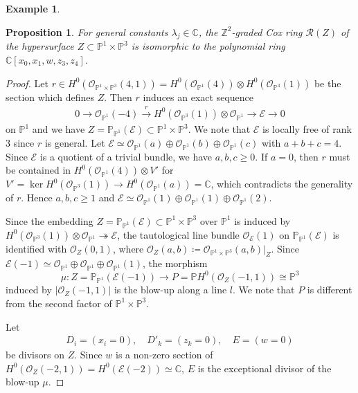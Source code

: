 \documentclass[a4paper,11pt]{amsart}
\theoremstyle{plain}
\newtheorem{proposition}[theorem]{Proposition}
\theoremstyle{definition}
\newtheorem{example}[theorem]{Example}
\newcommand{\C}{\mathbb{C}}
\newcommand{\p}{\mathbb{P}}
\newcommand{\R}{\mathcal{R}}
\newcommand{\Z}{\mathbb{Z}}
\newcommand{\Ox}{\mathcal{O}}
\newcommand{\balazs}[1]{{\color{blue} [#1]}}
\begin{document}
\begin{example}
\begin{proposition}\label{prop:linear}
         For general constants $\lambda_j\in\C$, the $\Z^2$-graded Cox ring $\R(Z)$ of the hypersurface $Z \subset \p^1 \times \p^3$ is isomorphic to the polynomial ring $\C[x_0,x_1,w,z_3,z_4]$.    
\end{proposition}

\begin{proof}
Let $r \in H^0(\Ox_{\p^1 \times \p^3}(4,1)) =H^0(\Ox_{\p^1}(4)) \otimes H^0( \Ox_{\p^3}(1)) $ be the section which defines $Z$.
Then $r$ induces an exact sequence
\begin{align*}
0 \to \Ox_{\p^1}(-4) \xrightarrow{r} H^0( \Ox_{\p^3}(1)) \otimes \Ox_{\p^1} \to \mathcal{E} \to 0
\end{align*}
on $\p^1$
and we have $Z =\p_{\p^1}(\mathcal{E})\subset \p^1 \times \p^3$.
We note that $\mathcal{E}$ is locally free of rank $3$
since $r$ is general.
Let $\mathcal{E} \simeq \Ox_{\p^1} (a) \oplus \Ox_{\p^1} (b) \oplus \Ox_{\p^1} (c)$ with $a+b+c=4$.
Since $\mathcal{E}$ is a quotient of a trivial bundle, we have $a,b,c \geq 0$.
If $a =0$, then $r$ must be contained in $H^0(\Ox_{\p^1}(4)) \otimes V'$ for
$V' =\ker H^0(\Ox_{\p^3}(1)) \to H^0(\Ox_{\p^1}(a))=\C$,
which contradicts the generality of $r$.
Hence $a,b,c \geq 1$ and $\mathcal{E} \simeq  \Ox_{\p^1} (1) \oplus \Ox_{\p^1} (1) \oplus \Ox_{\p^1} (2)$. 


Since the embedding $Z =\p_{\p^1}(\mathcal{E})\subset \p^1 \times \p^3$ over $\p^1$ is induced by 
$H^0( \Ox_{\p^3}(1)) \otimes \Ox_{\p^1} \twoheadrightarrow \mathcal{E} $,
the tautological line bundle $\Ox_{\mathcal{E}}(1)$ on $ \p_{\p^1}(\mathcal{E})$ is identified with $\Ox_Z(0,1)$,
where $\Ox_Z(a,b) \coloneqq \Ox_{\p^1\times \p^3}(a,b)|_Z $.
Since $\mathcal{E}(-1) \simeq 
\Ox_{\p^1} \oplus \Ox_{\p^1} \oplus \Ox_{\p^1} (1)$, 
the morphism 
\[\mu : Z=\p_{\p^1}(\mathcal{E}(-1)) \to P = \p H^0(\Ox_Z(-1,1)) \cong\p^3\]
induced by $|\Ox_Z(-1,1)|$ is the blow-up along a line $l$.
We note that $P$ is different from the second factor of $\p^1 \times \p^3$.


Let 
\begin{align*}
D_i =(x_i=0), \quad D'_k=(z_k =0), \quad E=(w=0) 
\end{align*}
be divisors on $Z$.
Since $w$ is a non-zero section of $H^0( \Ox_Z(-2,1)) = H^0(\mathcal{E}(-2)) \simeq \C$,
$E$ is the exceptional divisor of the blow-up $\mu$.


\end{proof}
\end{example}
\end{document}
